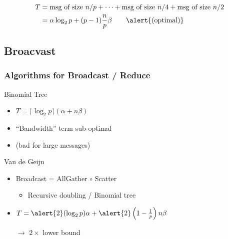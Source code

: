 \documentclass[xcolor={rgb,x11names,svgnames},rgb,x11names,svgnames]{beamer}
\begin{document}
\begin{frame}[label=alg]
\begin{center}
\begin{tikzpicture}[scale=0.5, >=latex]
    \end{tikzpicture}
  \end{center}
  
\bigskip

\begin{align*}
  T &= \text{msg of size $n/p$}  + \dots + \text{msg of size $n/4$} + \text{msg of size $n/2$} \\
    &= \alpha \log_2 p + (p-1) \frac{n}{p} \beta \qquad \text{\alert{(optimal)}}
\end{align*}
\end{frame}


\subsection{Broacvast}

\begin{frame}
\frametitle{Algorithms for Broadcast / Reduce}

\begin{block}{Binomial Tree}
  \begin{itemize}
  \item $T = \lceil \log_2 p \rceil (\alpha + n \beta)$
  \item ``Bandwidth'' term sub-optimal
  \item (bad for large messages)
  \end{itemize}
\end{block}

\bigskip

\begin{block}{Van de Geijn}
  \begin{itemize}
  \item Broadcast = AllGather $\circ$ Scatter
    \begin{itemize}
    \item Recursive doubling / Binomial tree
    \end{itemize}
  \item $T = \alert{2}  (\log_2 p) \alpha +  \alert{2} \left(1 - \frac{1}{p}\right) n \beta$
  \item[$\rightarrow$] $2\times$ lower bound
  \end{itemize}
\end{block}
\end{frame}
\end{document}
